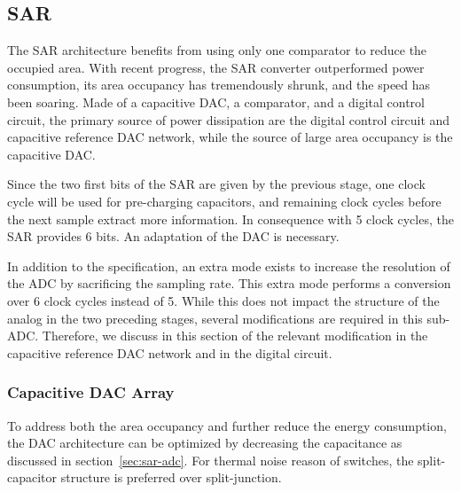 \subsection{SAR}                            %
The SAR architecture benefits from using only one comparator to reduce the occupied area. With recent progress, the SAR converter outperformed power consumption, its area occupancy has tremendously shrunk, and the speed has been soaring. Made of a capacitive DAC, a comparator, and a digital control circuit, the primary source of power dissipation are the digital control circuit and capacitive reference DAC network, while the source of large area occupancy is the capacitive DAC\@.

Since the two first bits of the SAR are given by the previous stage, one clock cycle will be used for pre-charging capacitors, and remaining clock cycles before the next sample extract more information. In consequence with 5 clock cycles, the SAR provides 6 bits. An adaptation of the DAC is necessary.

In addition to the specification, an extra mode exists to increase the resolution of the ADC by sacrificing the sampling rate. This extra mode performs a conversion over 6 clock cycles instead of 5. While this does not impact the structure of the analog in the two preceding stages, several modifications are required in this sub-ADC\@. Therefore, we discuss in this section of the relevant modification in the capacitive reference DAC network and in the digital circuit.

	\subsubsection{Capacitive DAC Array}    %
	\label{sec:capacitive-dac-sar-design}
To address both the area occupancy and further reduce the energy consumption, the DAC architecture can be optimized by decreasing the capacitance as discussed in section~\ref{sec:sar-adc}. For thermal noise reason of switches, the split-capacitor structure is preferred over split-junction.

